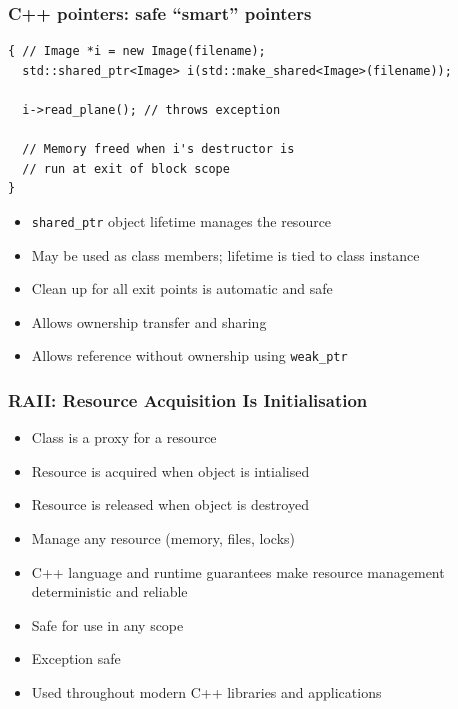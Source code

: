 \documentclass{beamer}
\begin{document}
\begin{frame}[fragile]
  \frametitle{C++ pointers: safe “smart” pointers}
  \begin{lstlisting}
{ // Image *i = new Image(filename);
  std::shared_ptr<Image> i(std::make_shared<Image>(filename));

  i->read_plane(); // throws exception

  // Memory freed when i's destructor is
  // run at exit of block scope
}

\end{lstlisting}
  \begin{itemize}
    \item \texttt{shared\_ptr} object lifetime manages the resource
    \item May be used as class members; lifetime is tied to class instance
    \item Clean up for all exit points is automatic and safe
    \item Allows ownership transfer and sharing
    \item Allows reference without ownership using \texttt{weak\_ptr}
  \end{itemize}
\end{frame}

\begin{frame}[fragile]
  \frametitle{RAII: Resource Acquisition Is Initialisation}
    \begin{itemize}
    \item Class is a proxy for a resource
    \item Resource is acquired when object is intialised
    \item Resource is released when object is destroyed
    \item Manage any resource (memory, files, locks)
    \item C++ language and runtime guarantees make resource management
      deterministic and reliable
    \item Safe for use in any scope
    \item Exception safe
    \item Used throughout modern C++ libraries and applications
    \end{itemize}
\end{frame}
\end{document}
